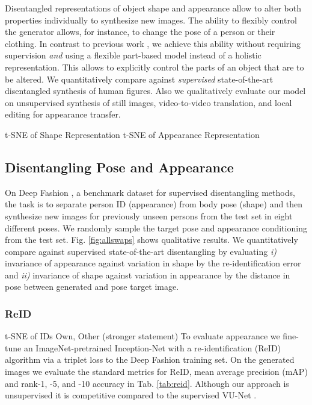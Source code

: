 	Disentangled representations of object shape and appearance allow to alter both properties individually to synthesize new images. The ability to flexibly control the generator allows, for instance, to change the pose of a person or their clothing. In contrast to previous work \cite{esser18, denton17disvideo, ma17poseguided, ma17disperson, debem18dgpose, jakab18},
	we achieve this ability without requiring supervision \textit{and} using a flexible part-based model instead of a holistic representation. This allows to explicitly control the parts of an object that are to be altered. We quantitatively compare against \emph{supervised} state-of-the-art disentangled synthesis of human figures. Also we qualitatively evaluate our model on unsupervised synthesis of still images, video-to-video translation, and local editing for appearance transfer.


	t-SNE of Shape Representation
	t-SNE of Appearance Representation


	\subsection{Disentangling Pose and Appearance}


	On Deep Fashion \cite{liu16deepfashion, liu16deepfashionwild}, a benchmark dataset for supervised disentangling methods, the task is to separate person ID (appearance) from body pose (shape) and then synthesize new images for previously unseen persons from the test set in eight different poses. We randomly sample the target pose and appearance conditioning from the test set. Fig. \ref{fig:allswaps} shows qualitative results.
	We quantitatively compare against supervised state-of-the-art disentangling \cite{esser18} by evaluating \emph{i)} invariance of appearance against variation in shape by the re-identification error and \emph{ii)} invariance of shape against variation in appearance by the distance in pose between generated and pose target image.

	\subsubsection{ReID}
	t-SNE of IDs
	Own, Other (stronger statement)
	To evaluate appearance we fine-tune an ImageNet-pretrained \cite{russakovsky15imagenet} Inception-Net \cite{szegedy15inception} with a re-identification (ReID) algorithm \cite{xiao17reidjoint} via a triplet loss \cite{hermans17reidtriplet} to the Deep Fashion training set.
	On the generated images we evaluate the standard metrics for ReID, mean average precision (mAP) and rank-1, -5, and -10 accuracy in Tab. \ref{tab:reid}.
	Although our approach is unsupervised it is competitive compared to the supervised VU-Net \cite{esser18}.



